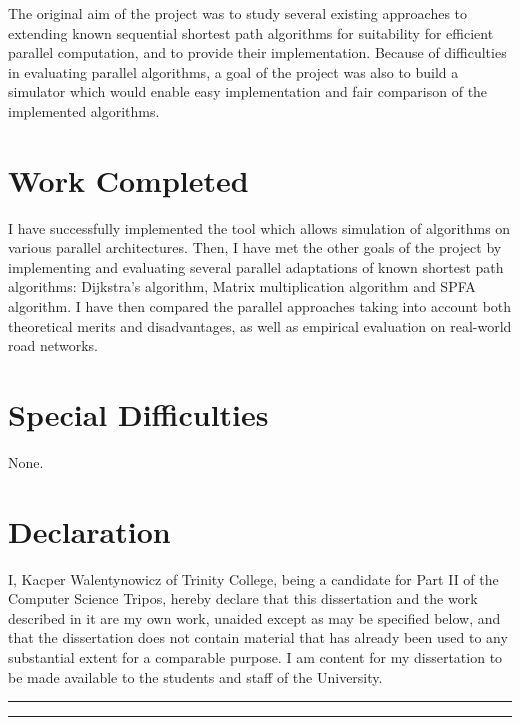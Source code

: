 \documentclass[12pt,a4paper,twoside,openright]{report}
\begin{document}
The original aim of the project was to study several existing approaches to extending known sequential shortest path algorithms for suitability for efficient parallel computation, and to provide their implementation. Because of difficulties in evaluating parallel algorithms, a goal of the project was also to build a simulator which would enable easy implementation and fair comparison of the implemented algorithms.

\section*{Work Completed}

I have successfully implemented the tool which allows simulation of algorithms on various parallel architectures. Then, I have met the other goals of the project by implementing and evaluating several parallel adaptations of known shortest path algorithms: Dijkstra's algorithm, Matrix multiplication algorithm and SPFA algorithm. I have then compared the parallel approaches taking into account both theoretical merits and disadvantages, as well as empirical evaluation on real-world road networks.

\section*{Special Difficulties}

None.
 
\newpage
\section*{Declaration}

I, Kacper Walentynowicz of Trinity College, being a candidate for Part II of the Computer Science Tripos, hereby declare that this dissertation and the work described in it are my own work, unaided except as may be specified below, and that the dissertation does not contain material that has already been used to any substantial extent for a comparable purpose. I am content for my dissertation to be made available to the students and staff of the University.

\bigskip
{}
\vspace{20pt}
\par\noindent\rule{\textwidth}{0.4pt}

\medskip
{}
\vspace{20pt}
\par\noindent\rule{\textwidth}{0.4pt}
\end{document}
